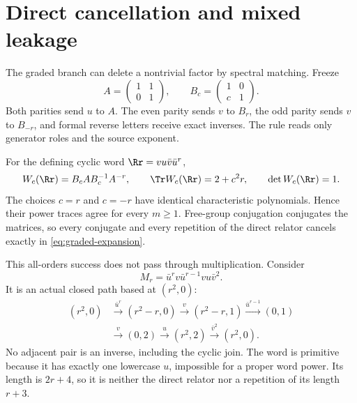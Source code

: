 \section{Direct cancellation and mixed leakage}
\label{sec:shear}

The graded branch can delete a nontrivial factor by spectral matching.  Freeze
\begin{equation}
  A=\begin{pmatrix}1&1\\0&1\end{pmatrix},
  \qquad
  B_c=\begin{pmatrix}1&0\\c&1\end{pmatrix}.
  \label{eq:shear-matrices}
\end{equation}
Both parities send $u$ to $A$.  The even parity sends $v$ to $B_r$, the odd
parity sends $v$ to $B_{-r}$, and formal reverse letters receive exact
inverses.  The rule reads only generator roles and the source exponent.

For the defining cyclic word $\Rr=vu\bar v\bar u^r$,
\begin{equation}
  W_c(\Rr)=B_cAB_c^{-1}A^{-r},
  \qquad
  \Tr W_c(\Rr)=2+c^2r,
  \qquad
  \det W_c(\Rr)=1.
  \label{eq:direct-characteristic}
\end{equation}
The choices $c=r$ and $c=-r$ have identical characteristic polynomials.
Hence their power traces agree for every $m\ge1$.  Free-group conjugation
conjugates the matrices, so every conjugate and every repetition of the direct
relator cancels exactly in \cref{eq:graded-expansion}.

This all-orders success does not pass through multiplication.  Consider
\begin{equation}
  M_r=\bar u^r v\bar u^{r-1}vu\bar v^2.
  \label{eq:mixed-word}
\end{equation}
It is an actual closed path based at $(r^2,0)$:
\begin{equation}
\begin{aligned}
  (r^2,0)&\xrightarrow{\bar u^r}(r^2-r,0)
  \xrightarrow{v}(r^2-r,1)
  \xrightarrow{\bar u^{r-1}}(0,1)\\
  &\xrightarrow{v}(0,2)
  \xrightarrow{u}(r^2,2)
  \xrightarrow{\bar v^2}(r^2,0).
\end{aligned}
\label{eq:mixed-path}
\end{equation}
No adjacent pair is an inverse, including the cyclic join.  The word is
primitive because it has exactly one lowercase $u$, impossible for a proper
word power.  Its length is $2r+4$, so it is neither the direct relator nor a
repetition of its length $r+3$.

